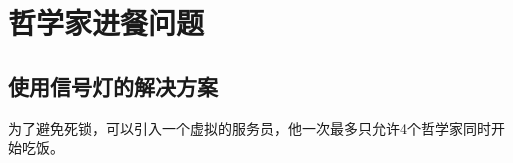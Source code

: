 
\section{哲学家进餐问题}
{
    \subsection{使用信号灯的解决方案}
    {
        为了避免死锁，可以引入一个虚拟的服务员，他一次最多只允许4个哲学家同时开始吃饭。
    }
}
